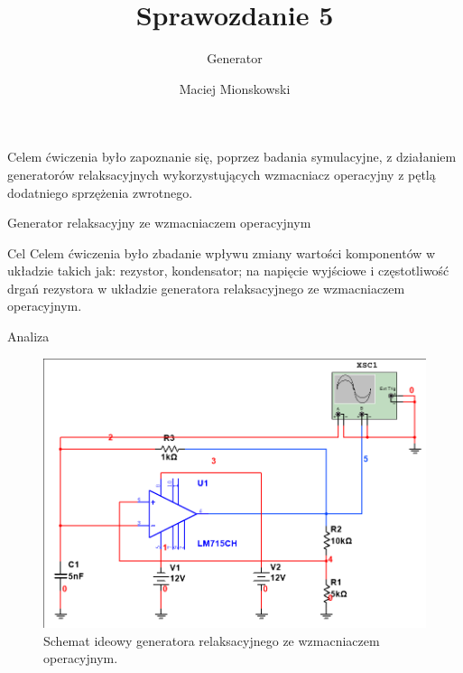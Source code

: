 \documentclass[a4paper]{scrartcl}
\author{Maciej Mionskowski}
\title{Sprawozdanie 5}
\date{}
\subtitle{Generator}
\begin{document}
	{\let\newpage\relax\maketitle}
	{\begin{center}Celem ćwiczenia było zapoznanie się, poprzez badania symulacyjne, z działaniem generatorów relaksacyjnych wykorzystujących wzmacniacz operacyjny z pętlą dodatniego sprzężenia zwrotnego.\end{center}}
	\begin{section}{Generator relaksacyjny ze wzmacniaczem operacyjnym}
		\begin{subsection}{Cel}
			Celem ćwiczenia było zbadanie wpływu zmiany wartości komponentów w układzie takich jak: rezystor, kondensator; na napięcie wyjściowe i częstotliwość drgań rezystora w układzie generatora relaksacyjnego ze wzmacniaczem operacyjnym.
		\end{subsection}
		\begin{subsection}{Analiza}
				\begin{figure}[ht]
				\begin{center}
					\includegraphics[width=0.8\linewidth]{03-circuit}
					\caption{Schemat ideowy generatora relaksacyjnego ze wzmacniaczem operacyjnym.}
					\label{fig:circuit-1}
				\end{center}
				\end{figure}


\end{subsection}
\end{section}
\end{document}
